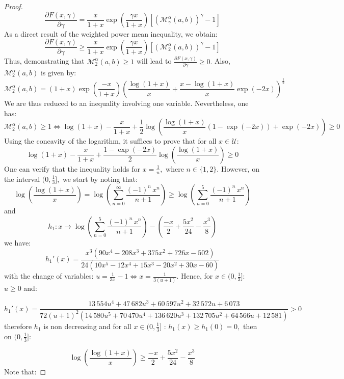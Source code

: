 \documentclass[11pt]{amsart}
\newcommand{\1}{[1]}
\begin{document}
\begin{proof}
$$\frac{\partial F(x,\gamma)}{\partial \gamma} =
\frac{x}{1+x}  \exp \left( \frac{\gamma x}{1+x} \right) \left[ \left( \mathcal{M}_{\gamma}^{\alpha} (a,b)\right)^{\gamma} -1 \right]$$
As a direct result of the weighted power mean inequality, we obtain:
$$\frac{\partial F(x,\gamma)}{\partial \gamma} \geq 
\frac{x}{1+x}  \exp \left( \frac{\gamma x}{1+x} \right) \left[ \left( \mathcal{M}_{2}^{\alpha} (a,b)\right)^{\gamma} -1 \right]
$$
Thus, demonstrating that $\mathcal{M}_{2}^{\alpha} (a,b) \geq 1$ will lead to  $\frac{\partial F(x,\gamma)}{\partial \gamma} \geq 0.$ Also, $\mathcal{M}_{2}^{\alpha} (a,b)$ is given by:
$$ \mathcal{M}_{2}^{\alpha} (a,b)
= (1+x) \exp \left( \frac{-x}{1+x} \right) \left( \frac{\log(1+x)}{x} + \frac{x-\log(1+x)}{x} \exp(-2x) \right)^{\frac{1}{2}}
$$
We are thus reduced to an inequality involving one variable. Nevertheless, one has: 
$$ \mathcal{M}_{2}^{\alpha} (a,b) \geq 1  \Leftrightarrow  \log(1+x)
-\frac{x}{1+x} + \frac{1}{2} \log \left(  \frac{\log(1+x)}{x} (1-\exp(-2x)) +\exp(-2x) \right) \geq 0
$$
Using the concavity of the logarithm, it suffices to prove that for all $x \in \mathcal{U}:$
$$\log(1+x)
-\frac{x}{1+x} +  \frac{1-\exp(-2x)}{2} \log \left(  \frac{\log(1+x)}{x} \right) \geq 0 $$
One can verify that the inequality holds for $x = \frac{1}{n},$ where $ n \in \{1, 2\}.$ However, on the interval $(0, \frac{1}{3}],$ we start by noting that:
$$ \log \left(  \frac{\log(1+x)}{x} \right)  =  \log \left(  \sum_{n=0}^{\infty} \frac{(-1)^{n}\, x^{n}}{n+1} \right) \geq \log \left(  \sum_{n=0}^{5} \frac{(-1)^{n}\, x^{n}}{n+1} \right)$$
and
$$h_{1}: x \to \log \left(  \sum_{n=0}^{5} \frac{(-1)^{n}\, x^{n}}{n+1} \right) - \left( \frac{-x}{2} + \frac{5x^2}{24} -\frac{x^3}{8} \right)$$
we have:
$$h_{1}'(x) =\frac{x^3 \left(90 x^4 - 208 x^3 + 375 x^2 + 726 x - 502\right)}{24 \left(10 x^5 - 12 x^4 + 15 x^3 - 20 x^2 + 30 x - 60\right)}
$$
with the change of variables: $u = \frac{1}{3x} - 1 \Leftrightarrow x = \frac{1}{3(u + 1)}.$ Hence, for $x\in (0,\frac{1}{3}]:$ $ u \geq 0 $ and:

$$h_{1}'(x)=\frac{13\,554 u^4 + 47\,682 u^3 + 60\,597 u^2 + 32\,572 u + 6\,073}{72 (u + 1)^2 \left(14\,580 u^5 + 70\,470 u^4 + 136\,620 u^3 + 132\,705 u^2 + 64\,566 u + 12\,581\right)} > 0
$$
therefore $h_{1}$ is non decreasing and for all $x \in (0,\frac{1}{3}]$ :
$h_{1}(x) \geq h_{1}(0) = 0,$ then on $(0,\frac{1}{3}]$:

$$\log \left(  \frac{\log(1+x)}{x} \right) \geq \frac{-x}{2} + \frac{5x^2}{24} -\frac{x^3}{8}
$$
Note that:


\end{proof}
\end{document}
